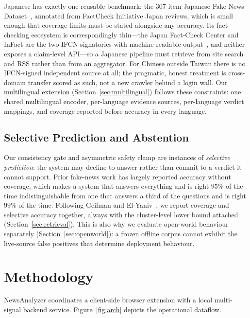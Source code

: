 \documentclass[twoside]{llncs}
\begin{document}
Japanese has exactly one reusable benchmark: the $307$-item Japanese Fake News Dataset~\cite{murayama2022japanese}, annotated from FactCheck Initiative Japan reviews, which is small enough that coverage limits must be stated alongside any accuracy. Its fact-checking ecosystem is correspondingly thin---the Japan Fact-Check Center and InFact are the two IFCN signatories with machine-readable output~\cite{jfc2024, infact2024}, and neither exposes a claim-level API---so a Japanese pipeline must retrieve from site search and RSS rather than from an aggregator. For Chinese outside Taiwan there is no IFCN-signed independent source at all; the pragmatic, honest treatment is cross-domain transfer scored as such, not a new crawler behind a login wall. Our multilingual extension (Section~\ref{sec:multilingual}) follows these constraints: one shared multilingual encoder, per-language evidence sources, per-language verdict mappings, and coverage reported before accuracy in every language.

\subsection{Selective Prediction and Abstention}
Our consistency gate and asymmetric safety clamp are instances of \emph{selective prediction}: the system may decline to answer rather than commit to a verdict it cannot support. Prior fake-news work has largely reported accuracy without coverage, which makes a system that answers everything and is right $95\%$ of the time indistinguishable from one that answers a third of the questions and is right $99\%$ of the time. Following Geifman and El-Yaniv~\cite{geifman2019selective}, we report coverage and selective accuracy together, always with the cluster-level lower bound attached (Section~\ref{sec:retrieval}). This is also why we evaluate open-world behaviour separately (Section~\ref{sec:openworld}): a frozen offline corpus cannot exhibit the live-source false positives that determine deployment behaviour.

\section{Methodology}
\label{sec:method}

NewsAnalyzer coordinates a client-side browser extension with a local multi-signal backend service. Figure~\ref{fig:arch} depicts the operational dataflow.
\end{document}

